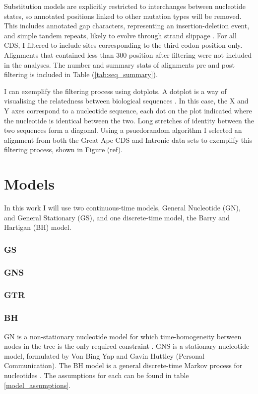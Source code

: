 Substitution models are explicitly restricted to interchanges between nucleotide states, so annotated positions linked to other mutation types will be removed. This includes annotated gap characters, representing an insertion-deletion event, and simple tandem repeats, likely to evolve through strand slippage \citep{Levinson1987Slipped-strandEvolution}. For all CDS, I filtered to include sites corresponding to the third codon position only. Alignments that contained less than $300$ position after filtering were not included in the analyses. The number and summary stats of alignments pre and post filtering is included in Table (\ref{tab:seq_summary}). 



I can exemplify the filtering process using dotplots. A dotplot is a way of visualising the relatedness between biological sequences \citep{Gibbs1970TheSequences}. In this case, the X and Y axes correspond to a nucleotide sequence, each dot on the plot indicated where the  nucleotide is identical between the two. Long stretches of identity between the two sequences form a diagonal. Using a psuedorandom algorithm I selected an alignment from both the Great Ape CDS and Intronic data sets to exemplify this filtering process, shown in Figure (ref). 



\section{Models}

In this work I will use two continuous-time models, General Nucleotide (GN), and General Stationary (GS), and one discrete-time model, the Barry and Hartigan (BH) model. 

\subsubsection{GS}

\subsubsection{GNS}


\subsubsection{GTR}


\subsubsection{BH}
GN is a non-stationary nucleotide model for which time-homogeneity between nodes in the tree is the only required constraint \citep{Kaehler2015}. GNS is a stationary nucleotide model, formulated by Von Bing Yap and Gavin Huttley (Personal Communication). The BH model is a general discrete-time Markov process for nucleotides \citep{Barry1987StatisticalEvolution}. The assumptions for each can be found in table \ref{model_assumptions}.




